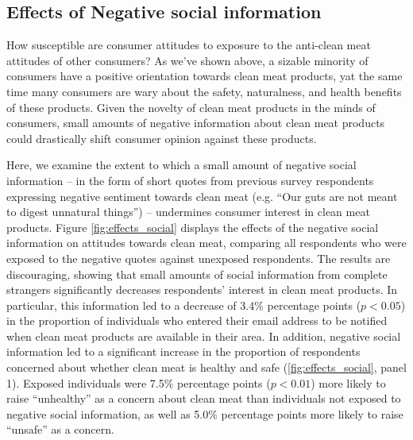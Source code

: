 \documentclass[12pt]{article}
\begin{document}
\subsection{Effects of Negative social information}

How susceptible are consumer attitudes to exposure to the anti-clean meat attitudes of other consumers? As we've shown above, a sizable minority of consumers have a positive orientation towards clean meat products, yat the same time many consumers are wary about the safety, naturalness, and health benefits of these products. Given the novelty of clean meat products in the minds of consumers, small amounts of negative information about clean meat products could drastically shift consumer opinion against these products.

Here, we examine the extent to which a small amount of negative social information -- in the form of short quotes from previous survey respondents expressing negative sentiment towards clean meat (e.g. ``Our guts are not meant to digest unnatural things'') -- undermines consumer interest in clean meat products. Figure \ref{fig:effects_social} displays the effects of the negative social information on attitudes towards clean meat, comparing all respondents who were exposed to the negative quotes against unexposed respondents. The results are discouraging, showing that small amounts of social information from complete strangers significantly decreases respondents' interest in clean meat products. In particular, this information led to a decrease of 3.4\% percentage points ($p < 0.05$) in the proportion of individuals who entered their email address to be notified when clean meat products are available in their area. In addition, negative social information led to a significant increase in the proportion of respondents concerned about whether clean meat is healthy and safe (\ref{fig:effects_social}, panel 1). Exposed individuals were 7.5\% percentage points ($p < 0.01$) more likely to raise ``unhealthy'' as a concern about clean meat than individuals not exposed to negative social information, as well as 5.0\% percentage points more likely to raise ``unsafe'' as a concern.

\end{document}
